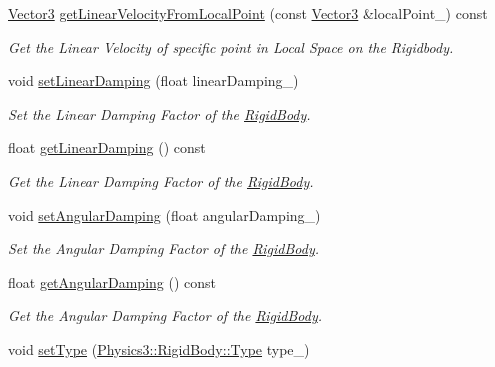 \begin{DoxyCompactItemize}
\hyperlink{class_magnum_1_1_vector3}{Vector3} \hyperlink{class_magnum_1_1_physics3_1_1_rigid_body_a7a4dbcf05af73238c38fc7af5d0c770d}{get\+Linear\+Velocity\+From\+Local\+Point} (const \hyperlink{class_magnum_1_1_vector3}{Vector3} \&local\+Point\+\_\+) const 
\begin{DoxyCompactList}\small\item\em Get the Linear Velocity of specific point in Local Space on the Rigidbody. \end{DoxyCompactList}\item 
void \hyperlink{class_magnum_1_1_physics3_1_1_rigid_body_a18b11ba71a9fe6f3c7dd373236b8ac0a}{set\+Linear\+Damping} (float linear\+Damping\+\_\+)
\begin{DoxyCompactList}\small\item\em Set the Linear Damping Factor of the \hyperlink{class_magnum_1_1_physics3_1_1_rigid_body}{Rigid\+Body}. \end{DoxyCompactList}\item 
float \hyperlink{class_magnum_1_1_physics3_1_1_rigid_body_a3225fd99befcded45b3e7fe076ecdea0}{get\+Linear\+Damping} () const 
\begin{DoxyCompactList}\small\item\em Get the Linear Damping Factor of the \hyperlink{class_magnum_1_1_physics3_1_1_rigid_body}{Rigid\+Body}. \end{DoxyCompactList}\item 
void \hyperlink{class_magnum_1_1_physics3_1_1_rigid_body_a9229ab433d81d4b46aeaa237aac185c2}{set\+Angular\+Damping} (float angular\+Damping\+\_\+)
\begin{DoxyCompactList}\small\item\em Set the Angular Damping Factor of the \hyperlink{class_magnum_1_1_physics3_1_1_rigid_body}{Rigid\+Body}. \end{DoxyCompactList}\item 
float \hyperlink{class_magnum_1_1_physics3_1_1_rigid_body_a5cae6065069c5a69990dfb0684bd8220}{get\+Angular\+Damping} () const 
\begin{DoxyCompactList}\small\item\em Get the Angular Damping Factor of the \hyperlink{class_magnum_1_1_physics3_1_1_rigid_body}{Rigid\+Body}. \end{DoxyCompactList}\item 
void \hyperlink{class_magnum_1_1_physics3_1_1_rigid_body_a0eb0367c94b2157e9b0dad40e9d58f1e}{set\+Type} (\hyperlink{class_magnum_1_1_physics3_1_1_rigid_body_a429aa4fb7256b083334c86cdcd0d6b31}{Physics3\+::\+Rigid\+Body\+::\+Type} type\+\_\+)

\end{DoxyCompactItemize}
